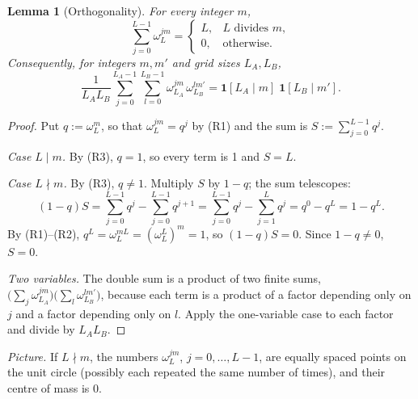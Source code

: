 \documentclass[11pt]{article}
\newtheorem{lemma}[theorem]{Lemma}
\theoremstyle{definition}
\theoremstyle{remark}
\begin{document}
\begin{lemma}[Orthogonality]\label{lem:orth}
For every integer $m$,
\[
\sum_{j=0}^{L-1}\omega_L^{jm}=\begin{cases}L,& L\text{ divides }m,\\ 0,&\text{otherwise.}\end{cases}
\]
Consequently, for integers $m,m'$ and grid sizes $L_A,L_B$,
\[
\frac1{L_AL_B}\sum_{j=0}^{L_A-1}\sum_{l=0}^{L_B-1}\omega_{L_A}^{jm}\,\omega_{L_B}^{lm'}=\mathbf 1[L_A\mid m]\;\mathbf 1[L_B\mid m'] .
\]
\end{lemma}
\begin{proof}
Put $q:=\omega_L^m$, so that $\omega_L^{jm}=q^j$ by (R1) and the sum is $S:=\sum_{j=0}^{L-1}q^j$.

\emph{Case $L\mid m$.} By (R3), $q=1$, so every term is 1 and $S=L$.

\emph{Case $L\nmid m$.} By (R3), $q\ne1$. Multiply $S$ by $1-q$; the sum telescopes:
\[
(1-q)S=\sum_{j=0}^{L-1}q^j-\sum_{j=0}^{L-1}q^{j+1}=\sum_{j=0}^{L-1}q^j-\sum_{j=1}^{L}q^{j}=q^0-q^L=1-q^L .
\]
By (R1)--(R2), $q^L=\omega_L^{mL}=(\omega_L^L)^m=1$, so $(1-q)S=0$. Since $1-q\ne0$, $S=0$.

\emph{Two variables.} The double sum is a product of two finite sums, $\big(\sum_j\omega_{L_A}^{jm}\big)\big(\sum_l\omega_{L_B}^{lm'}\big)$, because each term is a product of a factor depending only on $j$ and a factor depending only on $l$. Apply the one-variable case to each factor and divide by $L_AL_B$.
\end{proof}
\noindent \emph{Picture.} If $L\nmid m$, the numbers $\omega_L^{jm}$, $j=0,\dots,L-1$, are equally spaced points on the unit circle (possibly each repeated the same number of times), and their centre of mass is $0$.
\end{document}
